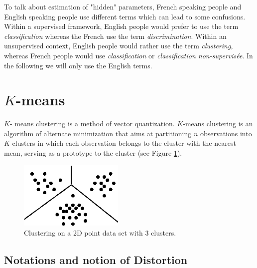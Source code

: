\documentclass[12pt]{report}
\begin{document}
 
 

\maketitle

\begin{danger}
 
 To talk about estimation of "hidden" parameters, French speaking people and English speaking people use different terms which can lead to some confusions. Within a supervised framework, English people would prefer to use the term \textit{classification} whereas the French use the term \textit{discrimination}. Within an unsupervised context, English people would rather use the term \textit{clustering}, whereas French people would use \textit{classification} or \textit{classification non-supervis\'ee}. In the following we will only use the English terms.

\end{danger}

\section{$K$-means}

$K$- means clustering is a method of vector quantization. $K$-means clustering is an algorithm
of alternate minimization that aims at partitioning $n$ observations into $K$ clusters in which each observation belongs to the cluster with the nearest mean, serving as a prototype to the cluster (see Figure \ref{kmeans01}).


\begin{figure}[ht]
  \label{kmeans01}
  \centering
  \includegraphics[width=5cm]{./figures/kmeans01.eps}
  \caption{Clustering on a 2D point data set with 3 clusters.}
\end{figure}

\subsection{Notations and notion of Distortion}
\end{document}
